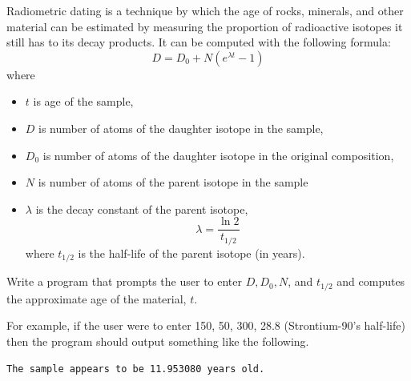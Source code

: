 \begin{exer}
Radiometric dating is a technique by which the age of rocks, minerals, 
and other material can be estimated by measuring the proportion of radioactive
isotopes it still has to its decay products.  It can be computed with the
following formula:
 $$D = D_0 + N (e^{\lambda t} - 1)$$
where
\begin{itemize}
  \item $t$ is age of the sample,
  \item $D$ is number of atoms of the daughter isotope in the sample,
  \item $D_0$ is number of atoms of the daughter isotope in the original composition,
  \item $N$ is number of atoms of the parent isotope in the sample 
  \item $\lambda$ is the decay constant of the parent isotope, 
  	$$\lambda = \frac{\ln{2}}{t_{1/2}}$$
	where $t_{1/2}$ is the half-life of the parent isotope (in years).
\end{itemize}
Write a program that prompts the user to enter $D, D_0, N$, and $t_{1/2}$ and 
computes the approximate age of the material, $t$.  

For example, if the user were to enter 150, 50, 300, 28.8 (Strontium-90's half-life)
then the program should output something like the following.

\begin{verbatim}
The sample appears to be 11.953080 years old.
\end{verbatim}
\end{exer}

